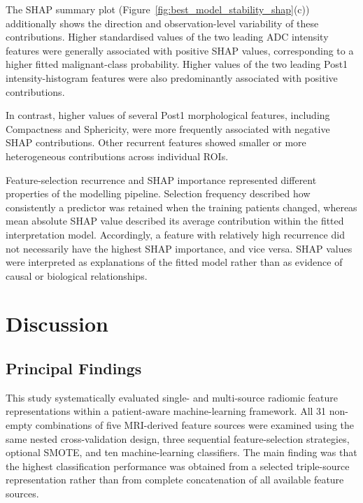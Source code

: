 \documentclass[12pt,twocolumn]{article}
\begin{document}
The SHAP summary plot
(Figure~\ref{fig:best_model_stability_shap}(c)) additionally shows the
direction and observation-level variability of these contributions.
Higher standardised values of the two leading ADC intensity features
were generally associated with positive SHAP values, corresponding
to a higher fitted malignant-class probability. Higher values of the
two leading Post1 intensity-histogram features were also predominantly
associated with positive contributions.

In contrast, higher values of several Post1 morphological features,
including Compactness and Sphericity, were more frequently associated
with negative SHAP contributions. Other recurrent features showed
smaller or more heterogeneous contributions across individual ROIs.

Feature-selection recurrence and SHAP importance represented
different properties of the modelling pipeline. Selection frequency
described how consistently a predictor was retained when the training
patients changed, whereas mean absolute SHAP value described its
average contribution within the fitted interpretation model.
Accordingly, a feature with relatively high recurrence did not
necessarily have the highest SHAP importance, and vice versa. SHAP
values were interpreted as explanations of the fitted model rather
than as evidence of causal or biological relationships.







\section{Discussion}
\label{sec:discussion}

\subsection{Principal Findings}
\label{subsec:discussion_principal_findings}

This study systematically evaluated single- and multi-source radiomic
feature representations within a patient-aware machine-learning
framework. All 31 non-empty combinations of five MRI-derived feature
sources were examined using the same nested cross-validation design,
three sequential feature-selection strategies, optional SMOTE, and
ten machine-learning classifiers. The main finding was that the
highest classification performance was obtained from a selected
triple-source representation rather than from complete concatenation
of all available feature sources.
\end{document}
